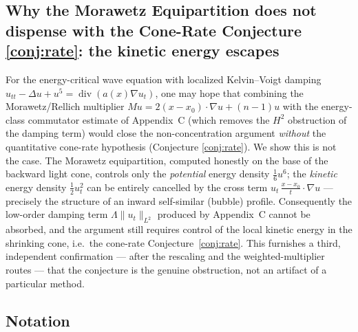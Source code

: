 \documentclass[11pt,letterpaper]{amsart}
\newcommand{\dive}{\operatorname{div}}
\begin{document}
\subsection{Why the Morawetz Equipartition does not dispense with the Cone-Rate Conjecture \ref{conj:rate}: the kinetic energy escapes}

For the energy-critical wave equation with localized Kelvin--Voigt damping
$u_{tt}-\Delta u+u^5=\dive(a(x)\nabla u_t)$, one may hope that combining the Morawetz/Rellich
multiplier $Mu=2(x-x_0)\cdot\nabla u+(n-1)u$ with the energy-class commutator estimate of
Appendix~C (which removes the $H^2$ obstruction of the damping term) would close the
non-concentration argument \emph{without} the quantitative cone-rate hypothesis (Conjecture \ref{conj:rate}).
We show this is not the case. The Morawetz equipartition, computed honestly on the base of the
backward light cone, controls only the \emph{potential} energy density $\tfrac16u^6$; the
\emph{kinetic} energy density $\tfrac12u_t^2$ can be entirely cancelled by the cross term
$u_t\,\tfrac{x-x_0}{t}\cdot\nabla u$ --- precisely the structure of an inward self-similar
(bubble) profile. Consequently the low-order damping term $\Lambda\|u_t\|_{L^2}$ produced by
Appendix~C cannot be absorbed, and the argument still requires control of the local kinetic
energy in the shrinking cone, i.e.\ the cone-rate Conjecture~\ref{conj:rate}. This furnishes a third,
independent confirmation --- after the rescaling and the weighted-multiplier routes --- that the
conjecture is the genuine obstruction, not an artifact of a particular method.

\subsection{Notation}
\end{document}

